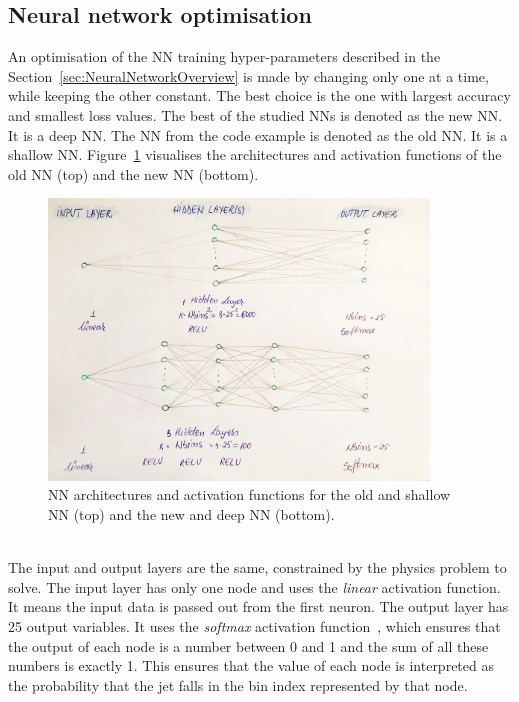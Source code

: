 \subsection{Neural network optimisation}
\label{sec:NeuralNetworkOptimisation}

An optimisation of the NN training hyper-parameters described in the Section~\ref{sec:NeuralNetworkOverview} is made by changing only one at a time, while keeping the other constant. The best choice is the one with largest accuracy and smallest loss values. The best of the studied NNs is denoted as the new NN. It is a deep NN. The NN from the code example is denoted as the old NN. It is a shallow NN. Figure~\ref{fig:NNArchitecture} visualises the architectures and activation functions of the old NN (top) and the new NN (bottom).

\begin{figure}[h]
  \centering
  \includegraphics[width=0.9\textwidth]{../presentation/plots/NNArchitecture.jpg}
  \caption{NN architectures and activation functions for the old and shallow NN (top) and the new and deep NN (bottom).}
  \label{fig:NNArchitecture}
\end{figure} 

\ \\The input and output layers are the same, constrained by the physics problem to solve. The input layer has only one node and uses the \emph{linear} activation function. It means the input data is passed out from the first neuron. The output layer has 25 output variables. It uses the \emph{softmax} activation function~\cite{softmax}, which ensures that the output of each node is a number between 0 and 1 and the sum of all these numbers is exactly 1. This ensures that the value of each node is interpreted as the probability that the jet falls in the bin index represented by that node.

